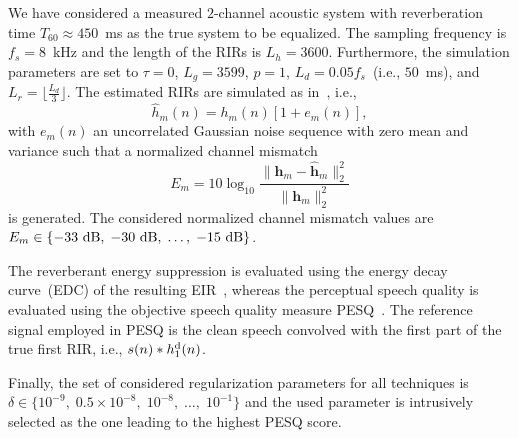 \documentclass[10pt]{IEEEtran}
\begin{document}
We have considered a measured $2$-channel acoustic system with reverberation time $T_{60} \approx 450$~ms as the true system to be equalized.
The sampling frequency is $f_s = 8$~kHz and the length of the RIRs is $L_h = 3600$.
Furthermore, the simulation parameters are set to $\tau = 0$, $L_g = 3599$, $p = 1$, $L_d = 0.05 f_s$~(i.e., $50$~ms), and $L_r = \lfloor \frac{L_d}{3} \rfloor$.
The estimated RIRs are simulated as in~\cite{Kodrasi_ITASLP_2013}, i.e., 
\begin{equation}
\hat{h}_m(n) = h_m(n)[1+e_m(n)],
\end{equation}
with $e_m(n)$ an uncorrelated Gaussian noise sequence with zero mean and variance such that a normalized channel mismatch 
\begin{equation}
 E_m = 10 \log_{10} \frac{\|\mathbf{h}_m-\hat{\mathbf{h}}_m\|_2^2}{\|\mathbf{h}_m\|_2^2}
\end{equation}
is generated. 
The considered normalized channel mismatch values are $E_m \in \{-33~{\rm dB}, \; -30~{\rm dB}, \; \ldots, \; -15~{\rm dB} \}$.

The reverberant energy suppression is evaluated using the energy decay curve~(EDC) of the resulting EIR~\cite{Naylor_derev_book}, whereas the perceptual speech quality is evaluated using the objective speech quality measure PESQ~\cite{PESQ}.
The reference signal employed in PESQ is the clean speech convolved with the first part of the true first RIR, i.e., $s(n) \ast h_1^{\rm d}(n)$.

Finally, the set of considered regularization parameters for all techniques is $\delta \in \{10^{-9}, \; 0.5 \times 10^{-8}, \; 10^{-8}, \; \ldots, \; 10^{-1} \}$ and the used parameter is intrusively selected as the one leading to the highest PESQ score.
\end{document}
